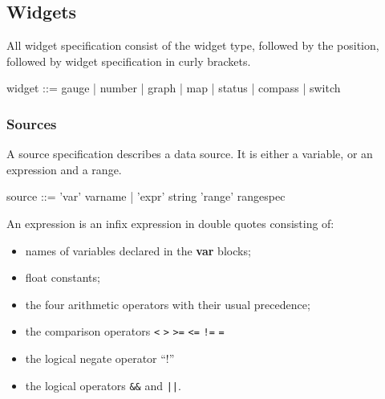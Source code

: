 \subsection{Widgets}
All widget specification consist of the widget type, followed by the position,
followed by widget specification in curly brackets.

\begin{v}
widget      ::= gauge | number | graph | map | status |
                compass | switch
\end{v}

\subsubsection{Sources}
A source specification describes a data source. It is either a
variable, or an expression and a range.
\begin{v}
source      ::= 'var' varname
            |   'expr' string 'range' rangespec
\end{v}
An expression is an infix expression in double quotes consisting of:
\begin{itemize}
\item names of variables declared in the \textbf{var} blocks;
\item float constants;
\item the four arithmetic operators with their usual precedence;
\item the comparison operators \verb+<+ \verb+>+ \verb+>=+ \verb+<=+ 
\verb+!=+ \verb+=+
\item the logical negate operator ``!''
\item the logical operators \verb+&&+ and \verb+||+.
\end{itemize}

